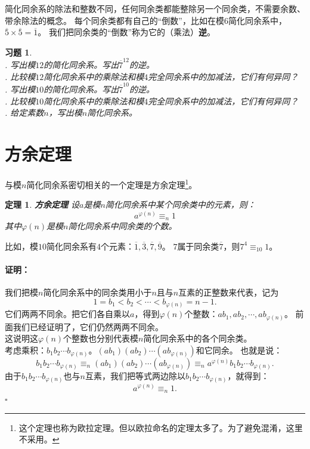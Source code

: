 \documentclass[12pt,UTF8]{ctexbook}
\newtheorem{tm}{定理}[section]
\newenvironment{proof2}{\paragraph{\textbf{证明：}}}{\hfill$\square$}
\newtheorem{xt}{习题}[section]
\begin{document}
简化同余系的除法和整数不同，任何同余类都能整除另一个同余类，不需要余数、带余除法的概念。
每个同余类都有自己的“倒数”，比如在模$6$简化同余系中，$\overline{5}\times\overline{5} = \overline{1}$。
我们把同余类的“倒数”称为它的（乘法）\textbf{逆}。

\begin{xt}
    \mbox{}\\
    . 写出模$12$的简化同余系。写出$\overline{7}^{12}$的逆。\\
    . 比较模$12$简化同余系中的乘除法和模$4$完全同余系中的加减法，它们有何异同？\\
    . 写出模$10$的简化同余系。写出$\overline{7}^{10}$的逆。\\
    . 比较模$10$简化同余系中的乘除法和模$4$完全同余系中的加减法，它们有何异同？\\
    . 给定素数$n$，写出模$n$简化同余系。
\end{xt}

\section{方余定理}
与模$n$简化同余系密切相关的一个定理是方余定理\footnote{这个定理也称为欧拉定理。但以欧拉命名的定理太多了。为了避免混淆，这里不采用。}。
\begin{tm}{\textbf{方余定理} }\label{tm:3-3-0}
    设$a$是模$n$简化同余系中某个同余类中的元素，则：
    $$ a^{\varphi(n)} \equiv_n 1 $$
    其中$\varphi(n)$是模$n$简化同余系中同余类的个数。
\end{tm}
比如，模$10$简化同余系有$4$个元素：$\overline{1}, \overline{3},\overline{7},\overline{9}$。
$7$属于同余类$\overline{7}$，则$7^4 \equiv_{10} 1$。

\begin{proof2}
    我们把模$n$简化同余系中的同余类用小于$n$且与$n$互素的正整数来代表，记为
    $$1 = b_1 < b_2 < \cdots < b_{\varphi(n)} = n-1.$$
    它们两两不同余。把它们各自乘以$a$，得到$\varphi(n)$个整数：$ab_1, ab_2, \cdots , ab_{\varphi(n)}$。
    前面我们已经证明了，它们仍然两两不同余。\\
    这说明这$\varphi(n)$个整数也分别代表模$n$简化同余系中的各个同余类。\\
    考虑乘积：$b_1 b_2 \cdots b_{\varphi(n)}$。$(ab_1) (ab_2) \cdots (ab_{\varphi(n)})$和它同余。
    也就是说：
    $$b_1 b_2 \cdots b_{\varphi(n)} \equiv_n (ab_1) (ab_2) \cdots (ab_{\varphi(n)}) \equiv_n a^{\varphi(n)} b_1 b_2 \cdots b_{\varphi(n)}.$$
    由于$b_1 b_2 \cdots b_{\varphi(n)}$也与$n$互素，我们把等式两边除以$b_1 b_2 \cdots b_{\varphi(n)}$，就得到：
    $$ a^{\varphi(n)} \equiv_n 1 . $$
\end{proof2}
\end{document}
